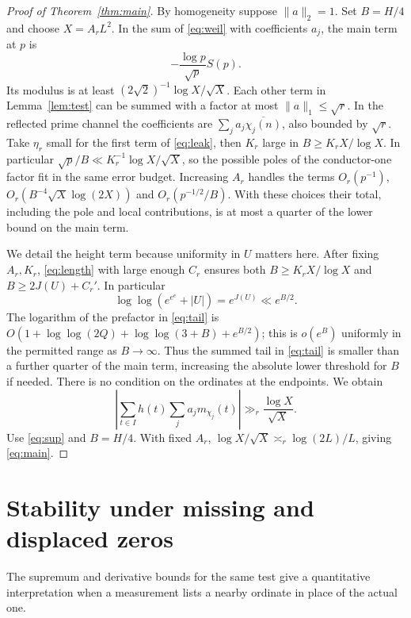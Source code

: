 \documentclass[11pt]{article}
\begin{document}
\begin{proof}[Proof of Theorem~\ref{thm:main}]
By homogeneity suppose \(\|a\|_2=1\). Set \(B=H/4\) and choose \(X=A_r L^2\). In the sum of \eqref{eq:weil} with coefficients \(a_j\), the main term at \(p\) is
\[
 -\frac{\log p}{\sqrt p} S(p).
\]
Its modulus is at least \((2\sqrt2)^{-1}\log X/\sqrt X\). Each other term in Lemma~\ref{lem:test} can be summed with a factor at most \(\|a\|_1\le\sqrt r\). In the reflected prime channel the coefficients are \(\sum_j a_j\overline{\chi_j(n)}\), also bounded by \(\sqrt r\). Take \(\eta_r\) small for the first term of \eqref{eq:leak}, then \(K_r\) large in \(B\ge K_r X/\log X\). In particular \(\sqrt p/B\ll K_r^{-1}\log X/\sqrt X\), so the possible poles of the conductor-one factor fit in the same error budget. Increasing \(A_r\) handles the terms \(O_r(p^{-1})\), \(O_r(B^{-4}\sqrt X\log(2X))\) and \(O_r(p^{-1/2}/B)\). With these choices their total, including the pole and local contributions, is at most a quarter of the lower bound on the main term.

We detail the height term because uniformity in \(U\) matters here. After fixing \(A_r,K_r\), \eqref{eq:length} with large enough \(C_r\) ensures both \(B\ge K_r X/\log X\) and \(B\ge 2J(U)+C_r'\). In particular
\[
 \log\log(e^{e^e}+|U|)=e^{J(U)}\ll e^{B/2}.
\]
The logarithm of the prefactor in \eqref{eq:tail} is
\(O(1+\log\log(2Q)+\log\log(3+B)+e^{B/2})\);
this is \(o(e^B)\) uniformly in the permitted range as \(B\to\infty\). Thus the summed tail in \eqref{eq:tail} is smaller than a further quarter of the main term, increasing the absolute lower threshold for \(B\) if needed. There is no condition on the ordinates at the endpoints. We obtain
\begin{equation}\label{eq:observable}
 \left|\sum_{t\in I} h(t)\sum_j a_jm_{\chi_j}(t)\right|
 \gg_r \frac{\log X}{\sqrt X}.
\end{equation}
Use \eqref{eq:sup} and \(B=H/4\). With fixed \(A_r\), \(\log X/\sqrt X\asymp_r\log(2L)/L\), giving \eqref{eq:main}.
\end{proof}

\section{Stability under missing and displaced zeros}
The supremum and derivative bounds for the same test give a quantitative interpretation when a measurement lists a nearby ordinate in place of the actual one.
\end{document}
